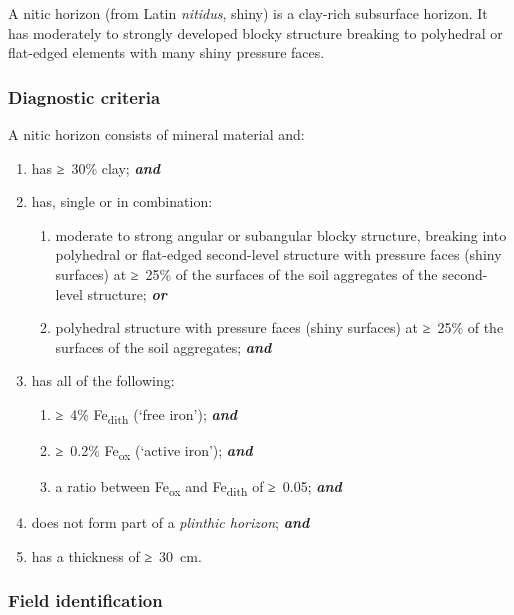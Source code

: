 \documentclass[
  letterpaper,
  DIV=11,
  numbers=noendperiod]{scrreprt}
\providecommand{\tightlist}{%
  \setlength{\itemsep}{0pt}\setlength{\parskip}{0pt}}\usepackage{longtable,booktabs,array}
\begin{document}
A nitic horizon (from Latin \emph{nitidus}, shiny) is a clay-rich
subsurface horizon. It has moderately to strongly developed blocky
structure breaking to polyhedral or flat-edged elements with many shiny
pressure faces.

\hypertarget{diagnostic-criteria-21}{%
\subsubsection{Diagnostic criteria}\label{diagnostic-criteria-21}}

A nitic horizon consists of mineral material and:

\begin{enumerate}
\def\labelenumi{\arabic{enumi}.}
\item
  has ≥~30\% clay; \textbf{\emph{and}}
\item
  has, single or in combination:

  \begin{enumerate}
  \def\labelenumii{\alph{enumii}.}
  \tightlist
  \item
    moderate to strong angular or subangular blocky structure, breaking
    into polyhedral or flat-edged second-level structure with pressure
    faces (shiny surfaces) at ≥~25\% of the surfaces of the soil
    aggregates of the second-level structure; \textbf{\emph{or}}
  \item
    polyhedral structure with pressure faces (shiny surfaces) at ≥~25\%
    of the surfaces of the soil aggregates; \textbf{\emph{and}}
  \end{enumerate}
\item
  has all of the following:

  \begin{enumerate}
  \def\labelenumii{\alph{enumii}.}
  \tightlist
  \item
    ≥~4\% Fe\textsubscript{dith} (`free iron'); \textbf{\emph{and}}
  \item
    ≥~0.2\% Fe\textsubscript{ox} (`active iron'); \textbf{\emph{and}}
  \item
    a ratio between Fe\textsubscript{ox} and Fe\textsubscript{dith} of
    ≥~0.05; \textbf{\emph{and}}
  \end{enumerate}
\item
  does not form part of a \emph{plinthic horizon}; \textbf{\emph{and}}
\item
  has a thickness of ≥~30~cm.
\end{enumerate}

\hypertarget{field-identification-16}{%
\subsubsection{Field identification}\label{field-identification-16}}
\end{document}
